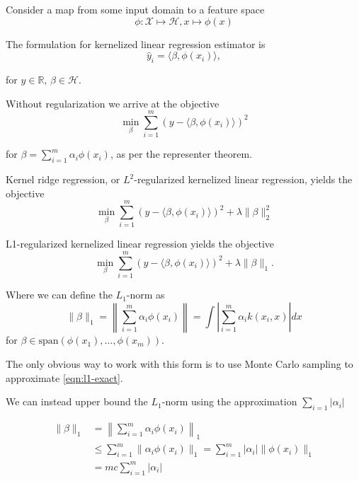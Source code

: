 \documentclass{article}
\newcommand{\hilb}{\mathcal{H}}
\begin{document}
Consider a map from some input domain to a feature space
\begin{equation}
\phi: \mathcal{X} \mapsto \hilb, x \mapsto \phi(x)
\end{equation}


The formulation for kernelized linear regression estimator is
\begin{equation}
\hat{y}_i = \langle \beta, \phi(x_i) \rangle,
\end{equation}

for $y \in \mathbb{R}$, $\beta \in \hilb$.


Without regularization we arrive at the objective
\begin{equation}
\min_\beta \sum_{i=1}^m (y - \langle \beta, \phi(x_i) \rangle)^2 
\end{equation}

for $\beta = \sum_{i=1}^m \alpha_i \phi(x_i)$, as per the representer theorem.

Kernel ridge regression, or $L^2$-regularized kernelized linear regression, yields the objective
\begin{equation}
\min_\beta \sum_{i=1}^m (y - \langle \beta, \phi(x_i) \rangle)^2 + \lambda \| \beta \|_2^2
\end{equation}

L1-regularized kernelized linear regression yields the objective
\begin{equation}
\min_\beta \sum_{i=1}^m (y - \langle \beta, \phi(x_i) \rangle)^2 + \lambda \| \beta \|_1.
\end{equation}

Where we can define the $L_1$-norm as
\begin{equation} \label{eqn:l1-exact}
\| \beta \|_1 = \left\| \sum_{i=1}^m \alpha_i \phi(x_i) \right\| = \int \left| \sum_{i=1}^m \alpha_i k(x_i, x) \right| dx
\end{equation}
for $\beta \in \text{span}(\phi(x_1), \ldots, \phi(x_m))$.

The only obvious way to work with this form is to use Monte Carlo sampling to approximate \eqref{eqn:l1-exact}.

We can instead upper bound the $L_1$-norm using the approximation $\sum_{i=1} | \alpha_i |$

\begin{align*}
  \| \beta \|_1 &= \left\| \sum_{i=1}^m \alpha_i \phi(x_i) \right\|_1 \\
  &\leq \sum_{i=1}^m \| \alpha_i \phi(x_i) \|_1 = \sum_{i=1}^m | \alpha_i | \| \phi(x_i) \|_1 \\
  & = m c \sum_{i=1}^m | \alpha_i |
\end{align*}
\end{document}

